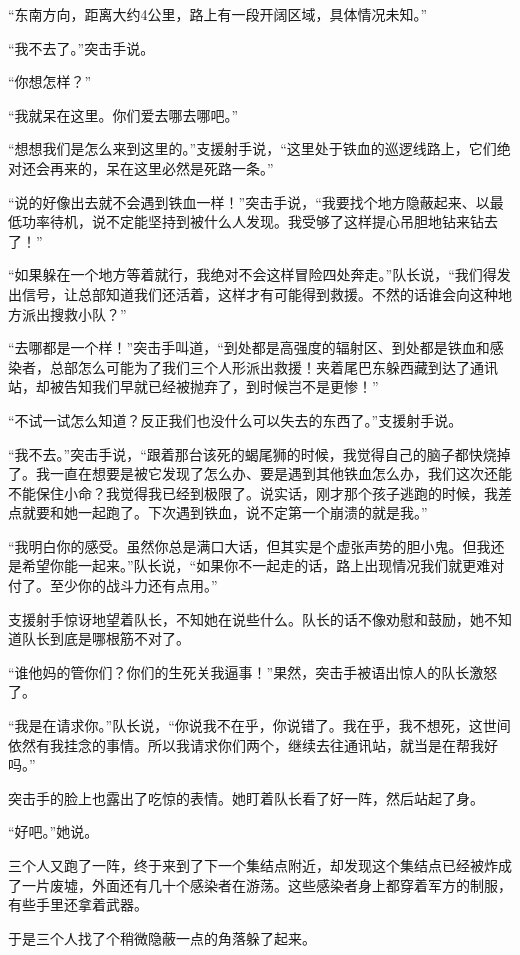 “东南方向，距离大约4公里，路上有一段开阔区域，具体情况未知。”

“我不去了。”突击手说。

“你想怎样？”

“我就呆在这里。你们爱去哪去哪吧。”

“想想我们是怎么来到这里的。”支援射手说，“这里处于铁血的巡逻线路上，它们绝对还会再来的，呆在这里必然是死路一条。”

“说的好像出去就不会遇到铁血一样！”突击手说，“我要找个地方隐蔽起来、以最低功率待机，说不定能坚持到被什么人发现。我受够了这样提心吊胆地钻来钻去了！”

“如果躲在一个地方等着就行，我绝对不会这样冒险四处奔走。”队长说，“我们得发出信号，让总部知道我们还活着，这样才有可能得到救援。不然的话谁会向这种地方派出搜救小队？”

“去哪都是一个样！”突击手叫道，“到处都是高强度的辐射区、到处都是铁血和感染者，总部怎么可能为了我们三个人形派出救援！夹着尾巴东躲西藏到达了通讯站，却被告知我们早就已经被抛弃了，到时候岂不是更惨！”

“不试一试怎么知道？反正我们也没什么可以失去的东西了。”支援射手说。

“我不去。”突击手说，“跟着那台该死的蝎尾狮的时候，我觉得自己的脑子都快烧掉了。我一直在想要是被它发现了怎么办、要是遇到其他铁血怎么办，我们这次还能不能保住小命？我觉得我已经到极限了。说实话，刚才那个孩子逃跑的时候，我差点就要和她一起跑了。下次遇到铁血，说不定第一个崩溃的就是我。”

“我明白你的感受。虽然你总是满口大话，但其实是个虚张声势的胆小鬼。但我还是希望你能一起来。”队长说，“如果你不一起走的话，路上出现情况我们就更难对付了。至少你的战斗力还有点用。”

支援射手惊讶地望着队长，不知她在说些什么。队长的话不像劝慰和鼓励，她不知道队长到底是哪根筋不对了。

“谁他妈的管你们？你们的生死关我逼事！”果然，突击手被语出惊人的队长激怒了。

“我是在请求你。”队长说，“你说我不在乎，你说错了。我在乎，我不想死，这世间依然有我挂念的事情。所以我请求你们两个，继续去往通讯站，就当是在帮我好吗。”

突击手的脸上也露出了吃惊的表情。她盯着队长看了好一阵，然后站起了身。

“好吧。”她说。 

三个人又跑了一阵，终于来到了下一个集结点附近，却发现这个集结点已经被炸成了一片废墟，外面还有几十个感染者在游荡。这些感染者身上都穿着军方的制服，有些手里还拿着武器。

于是三个人找了个稍微隐蔽一点的角落躲了起来。

